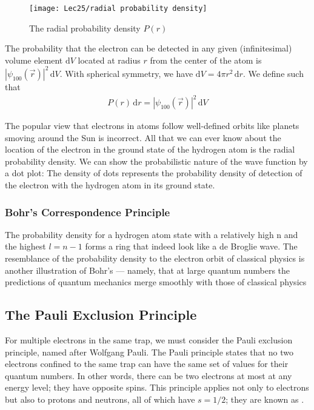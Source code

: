 \begin{figure}[H]
    \centering
    \texttt{[image: Lec25/radial probability density]}
    \caption{The radial probability density $P(r)$}
\end{figure}


The probability that the electron can be detected in any given (infinitesimal) volume element $\mathrm{d}V$ located at radius $r$ from the center of the atom is $|\psi_{100}(\vec{r})|^2\,\mathrm{d}V$. With spherical
symmetry, we have $\mathrm{d}V=4\pi r^2 \,\mathrm{d}r$. We define  such that
\begin{align*}
    P(r)\,\mathrm{d}r=|\psi_{100}(\vec{r})|^2\,\mathrm{d}V
\end{align*} 

The popular view that electrons in atoms follow well-defined orbits like planets smoving around the Sun is incorrect. All that we can ever know about the location of the electron in the ground state of the hydrogen atom is the radial probability density. We can show the probabilistic nature of the wave function by a dot plot: The density of dots represents the probability density of detection of the electron with the hydrogen atom in its ground state.

\subsubsection{Bohr’s Correspondence Principle}
The probability density for a hydrogen atom state with a relatively high n and the highest $l = n - 1$ forms a ring that indeed look like a de Broglie wave. The resemblance of the probability density to the electron orbit of classical physics is another illustration of Bohr’s  — namely, that at large quantum numbers the predictions of quantum mechanics merge smoothly with those of classical physics

\subsection{The Pauli Exclusion Principle}
For multiple electrons in the same trap, we must consider the Pauli exclusion principle, named after Wolfgang Pauli. The Pauli principle states that no two electrons confined to the same trap can have the same set of values for their quantum numbers. In other words, there can be two electrons at most at any energy level; they have opposite spins. This principle applies not only to electrons but also to protons and neutrons, all of which have $s = 1/2$; they are known as .

